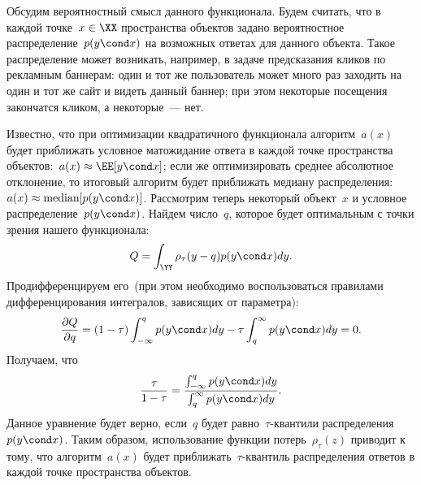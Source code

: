 \documentclass[12pt,a4paper]{article}
\begin{document}
Обсудим вероятностный смысл данного функционала.
Будем считать, что в каждой точке~$x \in \XX$ пространства объектов
задано вероятностное распределение~$p(y \cond x)$ на возможных ответах для данного объекта.
Такое распределение может возникать, например, в задаче предсказания кликов по рекламным баннерам:
один и тот же пользователь может много раз заходить на один и тот же сайт и видеть данный баннер;
при этом некоторые посещения закончатся кликом, а некоторые~--- нет.

Известно, что при оптимизации квадратичного функционала алгоритм~$a(x)$
будет приближать условное матожидание ответа в каждой точке пространства
объектов:~$a(x) \approx \EE [y \cond x]$;
если же оптимизировать среднее абсолютное отклонение, то итоговый алгоритм
будет приближать медиану распределения:~$a(x) \approx \text{median} [p(y \cond x)]$.
Рассмотрим теперь некоторый объект~$x$ и условное распределение~$p(y \cond x)$.
Найдем  число~$q$, которое будет оптимальным с точки зрения нашего функционала:
\[
    Q = \int_\YY \rho_\tau(y - q) p(y \cond x) dy.
\]
Продифференцируем его~(при этом необходимо воспользоваться правилами
дифференцирования интегралов, зависящих от параметра):
\[
    \frac{\partial Q}{\partial q}
    =
    (1 - \tau) \int_{-\infty}^{q} p(y \cond x) dy
    -
    \tau \int_{q}^{\infty} p(y \cond x) dy
    =
    0.
\]
Получаем, что
\[
    \frac{\tau}{1 - \tau}
    =
    \frac{
        \int_{-\infty}^{q} p(y \cond x) dy
    }{
        \int_{q}^{\infty} p(y \cond x) dy
    }.
\]
Данное уравнение будет верно, если~$q$ будет равно~$\tau$-квантили распределения~$p(y \cond x)$.
Таким образом, использование функции потерь~$\rho_\tau(z)$ приводит к тому,
что алгоритм~$a(x)$ будет приближать~$\tau$-квантиль распределения ответов в каждой точке
пространства объектов.
\end{document}
